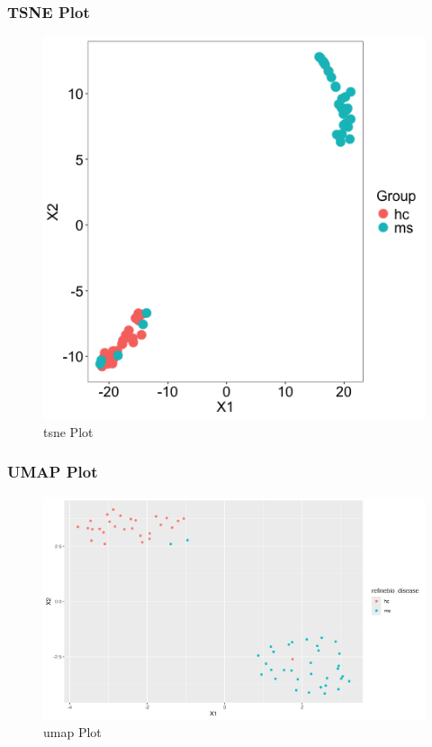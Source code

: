 \documentclass[
]{article}
\begin{document}
\subsubsection{TSNE Plot}\label{tsne-plot}

\begin{figure}
\centering
\includegraphics{../../plots/SRP164913_tsne_plot.png}
\caption{tsne Plot}
\end{figure}

\newpage

\subsubsection{UMAP Plot}\label{umap-plot}

\begin{figure}
\centering
\includegraphics{../../plots/SRP164913_umap_plot.png}
\caption{umap Plot}
\end{figure}
\end{document}
